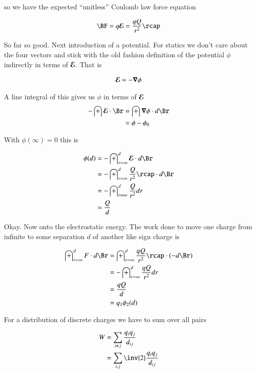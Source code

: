 so we have the expected ``unitless'' Coulomb law force equation

\begin{align*}
{\BF} = q\EE = \frac{q Q }{r^2} \rcap
\end{align*}

So far so good.  Next introduction of a potential.  For statics we don't care
about the four vectors and stick with the old fashion definition of the potential $\phi$ indirectly in terms of $\boldsymbol{\mathcal{E}}$.  That is

\begin{align*}
\boldsymbol{\mathcal{E}} = -\boldsymbol{\nabla} \phi
\end{align*}

A line integral of this gives us $\phi$ in terms of $\boldsymbol{\mathcal{E}}$
\begin{align*}
-\int \EE \cdot \Br 
&= \int \spacegrad \phi \cdot d\Br \\
&= \phi - \phi_0 \\
\end{align*}

With $\phi(\infty) = 0$ this is

\begin{align*}
\phi(d)
&= -\int_{r=\infty}^d \EE \cdot d\Br  \\
&= -\int_{r=\infty}^d \frac{Q}{r^2} \rcap \cdot d\Br  \\
&= -\int_{r=\infty}^d \frac{Q}{r^2} dr  \\
&= \frac{Q}{d} \\
\end{align*}

Okay.  Now onto the electrostatic energy.  The work done to move one charge from infinite to some separation $d$ of another like sign charge 
is

\begin{align*}
\int_{r=\infty}^{d} F \cdot d\Br 
&= \int_{r= \infty}^d \frac{q Q}{r^2} \rcap \cdot (-d\Br)  \\
&= -\int_{r= \infty}^d \frac{qQ}{r^2} dr  \\
&= \frac{qQ}{d} \\
&= q_1 \phi_2(d) \\
\end{align*}


For a distribution of discrete charges we have to sum over all pairs

\begin{align*}
W 
&= \sum_{i \ne j} \frac{q_i q_j}{d_{ij}} \\
&= \sum_{i,j} \inv{2} \frac{q_i q_j}{d_{ij}} \\
\end{align*}

